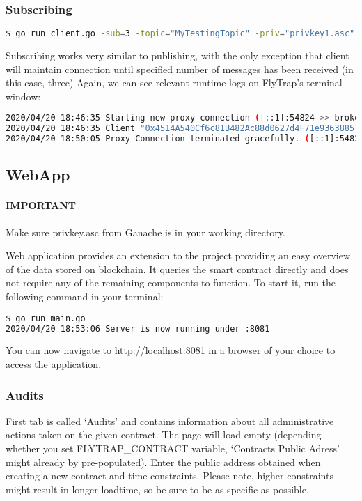 \subsubsection{Subscribing}
\begin{lstlisting}[language=bash,breaklines=true]
$ go run client.go -sub=3 -topic="MyTestingTopic" -priv="privkey1.asc" -ip="localhost:7777" -tls=false -f
\end{lstlisting}
Subscribing works very similar to publishing, with the only exception that client will maintain connection until specified number of messages has been received (in this case, three) Again, we can see relevant runtime logs on FlyTrap's terminal window:
\begin{lstlisting}[language=bash,breaklines=true]
2020/04/20 18:46:35 Starting new proxy connection ([::1]:54824 >> broker.hivemq.com:1883)
2020/04/20 18:46:35 Client "0x4514A540Cf6c81B482Ac88d0627d4F71e9363885" was authorised to subscribe to topic "MyTestingTopic"
2020/04/20 18:50:05 Proxy Connection terminated gracefully. ([::1]:54824 >> broker.hivemq.com:1883)
\end{lstlisting}
\subsection{WebApp}
\paragraph{IMPORTANT} Make sure privkey.asc from Ganache is in your working directory.

Web application provides an extension to the project providing an easy overview of the data stored on blockchain. It queries the smart contract directly and does not require any of the remaining components to function. To start it, run the following command in your terminal:
\begin{lstlisting}[language=bash,breaklines=true]
$ go run main.go
2020/04/20 18:53:06 Server is now running under :8081
\end{lstlisting}

You can now navigate to http://localhost:8081 in a browser of your choice to access the application.
\subsubsection{Audits}
First tab is called `Audits' and contains information about all administrative actions taken on the given contract. The page will load empty (depending whether you set FLYTRAP\_CONTRACT variable, `Contracts Public Adress' might already by pre-populated). Enter the public address obtained when creating a new contract and time constraints. Please note, higher constraints might result in longer loadtime, so be sure to be as specific as possible.

